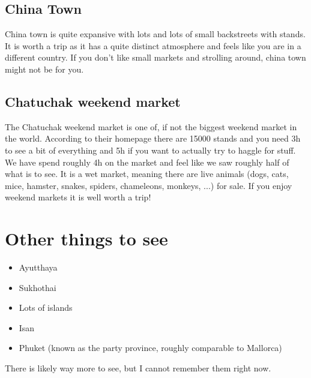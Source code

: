 \documentclass[11pt,a4paper,sans,english]{article}
\begin{document}
\subsection{China Town}
China town is quite expansive with lots and lots of small backstreets with stands. It is worth a trip as it has a quite distinct atmosphere and feels like you are in a different country. If you don't like small markets and strolling around, china town might not be for you.
\subsection{Chatuchak weekend market}
The Chatuchak weekend market is one of, if not the biggest weekend market in the world. According to their homepage there are 15000 stands and you need 3h to see a bit of everything and 5h if you want to actually try to haggle for stuff. We have spend roughly 4h on the market and feel like we saw roughly half of what is to see. It is a wet market, meaning there are live animals (dogs, cats, mice, hamster, snakes, spiders, chameleons, monkeys, ...) for sale. If you enjoy weekend markets it is well worth a trip!
\section{Other things to see}
\begin{itemize}
	\item Ayutthaya
	\item Sukhothai
	\item Lots of islands
	\item Isan
	\item Phuket (known as the party province, roughly comparable to Mallorca)
\end{itemize}
There is likely way more to see, but I cannot remember them right now.
\end{document}
